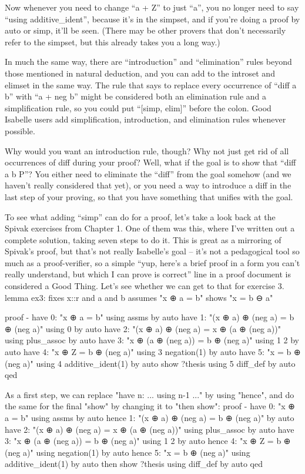 Now whenever you need to change ``a + Z'' to just ``a'', you no longer need to say ``using additive_ident'', because it's in the simpset, and if you're doing a proof by auto or simp, it'll be seen. (There may be other provers that don't necessarily refer to the simpset, but this already takes you a long way.)

In much the same way, there are ``introduction'' and ``elimination'' rules beyond those mentioned in natural deduction, and you can add to the introset and elimset in the same way. The rule that says to replace every occurrence of ``diff a b'' with ``a + neg b'' might be considered both an elimination rule and a simplification rule, so you could put ``[simp, elim]'' before the colon. Good Isabelle users add simplification, introduction, and elimination rules whenever possible. 

Why would you want an introduction rule, though? Why not just get rid of all occurrences of diff during your proof? Well, what if the goal is to show that ``diff a b \in P''? You either need to eliminate the ``diff'' from the goal somehow (and we haven't really considered that yet), or you need a way to introduce a diff in the last step of your proving, so that you have something that unifies with the goal. 

To see what adding ``simp'' can do for a proof, let's take a look back at the Spivak exercises from Chapter 1. One of them was this, where I've written out a complete solution, taking seven steps to do it. This is great as a mirroring of Spivak's proof, but that's not really Isabelle's goal -- it's not a pedagogical tool so much as a proof-verifier, so a simple ``yup, here's a brief proof in a form you can't really understand, but which I can prove is correct'' line in a proof document is considered a Good Thing. Let's see whether we can get to that for exercise 3. 
lemma ex3: 
  fixes x::r and a and b
  assumes "x ⊕ a = b"
  shows "x = b ⊖ a"

proof -
  have 0: "x ⊕ a = b" using assms by auto
  have 1: "(x ⊕ a) ⊕ (neg a) = b ⊕ (neg a)" using 0 by auto
  have 2: "(x ⊕ a) ⊕ (neg a) = x ⊕ (a ⊕ (neg a))" using plus_assoc by auto
  have 3: "x ⊕ (a ⊕ (neg a)) = b ⊕ (neg a)" using 1 2 by auto
  have 4: "x ⊕ Z = b ⊕ (neg a)" using 3 negation(1) by auto
  have 5: "x = b ⊕ (neg a)" using 4 additive_ident(1) by auto
  show ?thesis using 5 diff_def by auto
qed

As a first step, we can replace "have n: ... using n-1 ..." by using "hence", and do the same for the final "show" by changing it to "then show":
proof -
  have 0: "x ⊕ a = b" using assms by auto
  hence 1: "(x ⊕ a) ⊕ (neg a) = b ⊕ (neg a)" by auto
  have 2: "(x ⊕ a) ⊕ (neg a) = x ⊕ (a ⊕ (neg a))" using plus_assoc by auto
  have 3: "x ⊕ (a ⊕ (neg a)) = b ⊕ (neg a)" using 1 2 by auto
  hence 4: "x ⊕ Z = b ⊕ (neg a)" using negation(1) by auto
  hence 5: "x = b ⊕ (neg a)" using additive_ident(1) by auto
  then show ?thesis using diff_def by auto
qed

